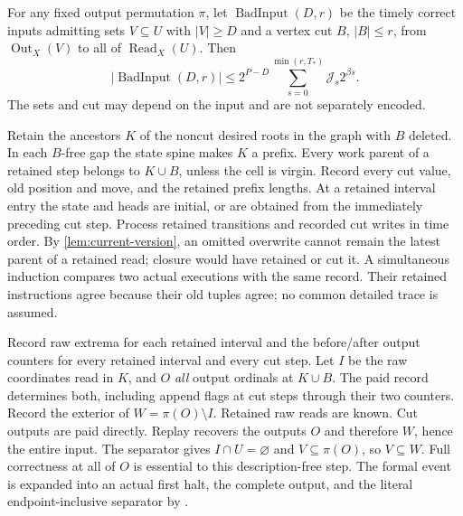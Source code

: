 \begin{theorem}\label{thm:input-cut}
For any fixed output permutation $\pi$, let $\operatorname{BadInput}(D,r)$
be the timely correct inputs admitting sets $V\subseteq U$ with $|V|\ge D$
and a vertex cut $B$, $|B|\le r$, from $\operatorname{Out}_X(V)$ to all of
$\operatorname{Read}_X(U)$. Then
\begin{equation}\label{eq:input-cut-count}
 |\operatorname{BadInput}(D,r)|\le
 2^{P-D}\sum_{s=0}^{\min(r,T_*)}\mathcal J_s2^{\beta s}.
\end{equation}
The sets and cut may depend on the input and are not separately encoded.
\end{theorem}
\begin{outline}
Retain the ancestors $K$ of the noncut desired roots in the graph with $B$
deleted. In each $B$-free gap the state spine makes $K$ a prefix. Every work
parent of a retained step belongs to $K\cup B$, unless the cell is virgin.
Record every cut value, old position and move, and the retained prefix lengths.
At a retained interval entry the state and heads are initial, or are obtained
from the immediately preceding cut step. Process retained transitions and
recorded cut writes in time order. By \cref{lem:current-version}, an omitted
overwrite cannot remain the latest parent of a retained read; closure would
have retained or cut it. A simultaneous induction compares two actual executions with the same
record. Their retained instructions agree because their old tuples agree;
no common detailed trace is assumed.

Record raw extrema for each retained interval and the before/after output
counters for every retained interval and every cut step. Let $I$ be the raw
coordinates read in $K$, and $O$ \emph{all} output ordinals at $K\cup B$.
The paid record determines both, including append flags at cut steps
through their two counters. Record the exterior of $W=\pi(O)\setminus I$. Retained
raw reads are known. Cut outputs are paid directly. Replay recovers the
outputs $O$ and therefore $W$, hence the entire input. The separator gives
$I\cap U=\varnothing$ and $V\subseteq\pi(O)$, so $V\subseteq W$.
Full correctness at all of $O$ is essential to this description-free step.
The formal event is expanded into an actual first halt, the complete output,
and the literal endpoint-inclusive separator by
.


\end{outline}
